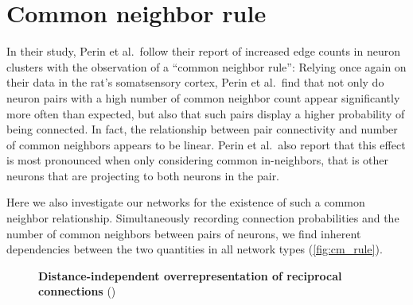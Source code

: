 
\section{Common neighbor rule}


In their study, Perin et al.\ follow their report of increased
  edge counts
in neuron clusters with the observation of a \enquote{common neighbor
  rule}: Relying once again on their data
in the rat's somatsensory cortex, Perin et al.\ find that not only do
neuron pairs with a high number of common neighbor count appear
significantly more often than expected, but also that such pairs
display a higher probability of being connected. In fact, the
relationship between pair connectivity and number of common neighbors
appears to be linear. Perin et al.\ also report that this effect is
most pronounced when only considering common in-neighbors, that is
other neurons that are projecting to both neurons in the pair.

Here we also investigate our networks for the existence of such a
common neighbor relationship. Simultaneously recording connection
probabilities and the number of common neighbors between pairs of
neurons, we find inherent dependencies between the two quantities in
all network types (\autoref{fig:cm_rule}). 


\begin{figure}[H]
  \centering
  \vfill
  \vspace{0.11cm}
  \vfill
  \vspace{0.11cm}
  \captionsetup{skip=7pt}
  \caption{\textbf{Distance-independent overrepresentation of
      reciprocal connections}  ()}
  \label{fig:cm_rule}
\end{figure}


